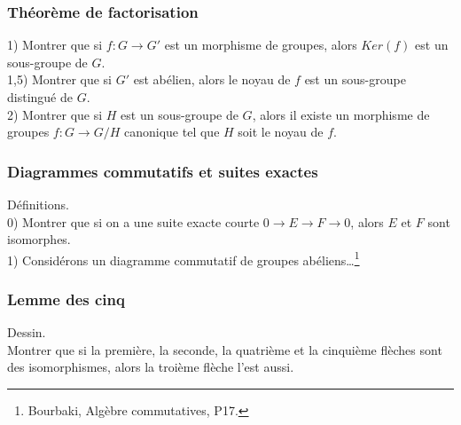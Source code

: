 \documentclass{article}
\begin{document}
\subsubsection{Th\'eor\`eme de factorisation}
1) Montrer que si $f:G\to G'$ est un morphisme de groupes, alors $Ker(f)$ est un sous-groupe de $G$.\\
1,5) Montrer que si $G'$ est ab\'elien, alors le noyau de $f$ est un sous-groupe distingu\'e de $G$.\\
2) Montrer que si $H$ est un sous-groupe de $G$, alors il existe un morphisme de groupes $f:G\to G/H$ canonique tel que $H$ soit le noyau de $f$.
\subsubsection{Diagrammes commutatifs et suites exactes}
D\'efinitions.\\
0) Montrer que si on a une suite exacte courte $0\to E\to F\to 0$, alors $E$ et $F$ sont isomorphes.\\
1) Consid\'erons un diagramme commutatif de groupes ab\'eliens\dots\footnote{Bourbaki, Alg\`ebre commutatives, P17.}
\subsubsection{Lemme des cinq}
Dessin.\\
Montrer que si la premi\`ere, la seconde, la quatri\`eme et la cinqui\`eme fl\`eches sont des isomorphismes, alors la troi\`eme fl\`eche l'est aussi.
\end{document}
